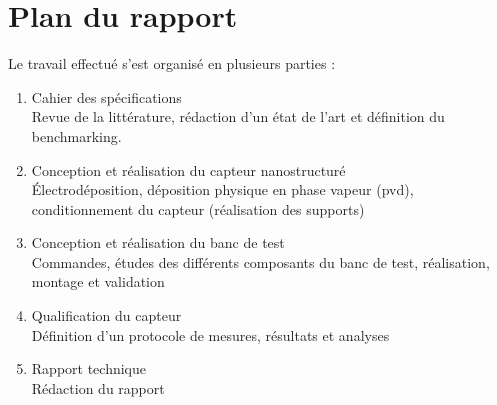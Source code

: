 \section{Plan du rapport}
Le travail effectué s'est organisé en plusieurs parties : \\
\begin{enumerate}
    \item Cahier des spécifications\\
          Revue de la littérature, rédaction d'un état de l'art et définition du benchmarking. \\
    \item Conception et réalisation du capteur nanostructuré\\
          Électrodéposition, déposition physique en phase vapeur (\gls{pvd}), conditionnement du capteur (réalisation des supports)\\
    \item Conception et réalisation du banc de test\\
          Commandes, études des différents composants du banc de test, réalisation, montage et validation\\
    \item Qualification du capteur\\
          Définition d'un protocole de mesures, résultats et analyses\\
    \item Rapport technique\\
          Rédaction du rapport
\end{enumerate}


